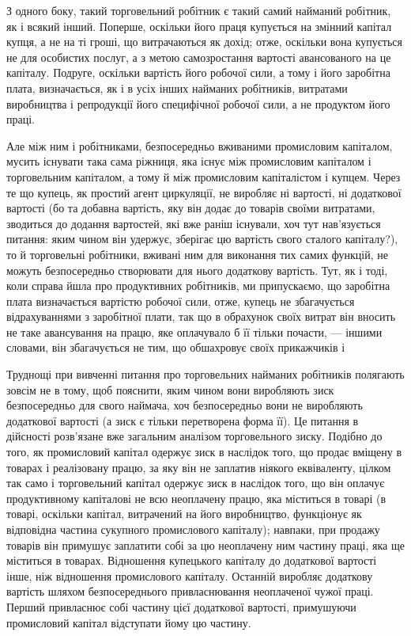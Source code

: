 
З одного боку, такий торговельний робітник є такий самий
найманий робітник, як і всякий інший. Поперше, оскільки його
праця купується на змінний капітал купця, а не на ті гроші, що
витрачаються як дохід; отже, оскільки вона купується не для
особистих послуг, а з метою самозростання вартості авансованого
на це капіталу. Подруге, оскільки вартість його робочої
сили, а тому і його заробітна плата, визначається, як і в усіх
інших найманих робітників, витратами виробництва і репродукції
його специфічної робочої сили, а не продуктом його праці.

Але між ним і робітниками, безпосередньо вживаними промисловим
капіталом, мусить існувати така сама ріжниця, яка існує
між промисловим капіталом і торговельним капіталом, а тому й
між промисловим капіталістом і купцем. Через те що купець, як
простий агент циркуляції, не виробляє ні вартості, ні додаткової
вартості (бо та добавна вартість, яку він додає до товарів своїми
витратами, зводиться до додання вартостей, які вже раніш існували,
хоч тут нав’язується питання: яким чином він удержує, зберігає
цю вартість свого сталого капіталу?), то й торговельні робітники,
вживані ним для виконання тих самих функцій, не можуть
безпосередньо створювати для нього додаткову вартість. Тут, як
і тоді, коли справа йшла про продуктивних робітників, ми припускаємо,
що заробітна плата визначається вартістю робочої сили,
отже, купець не збагачується відрахуваннями з заробітної плати,
так що в обрахунок своїх витрат він вносить не таке авансування
на працю, яке оплачувало б її тільки почасти, — іншими словами,
він збагачується не тим, що обшахровує своїх прикажчиків і~

Труднощі при вивченні питання про торговельних найманих
робітників полягають зовсім не в тому, щоб пояснити, яким чином
вони виробляють зиск безпосередньо для свого наймача, хоч
безпосередньо вони не виробляють додаткової вартості (а зиск
є тільки перетворена форма її). Це питання в дійсності розв’язане
вже загальним аналізом торговельного зиску. Подібно до
того, як промисловий капітал одержує зиск в наслідок того,
що продає вміщену в товарах і реалізовану працю, за яку він
не заплатив ніякого еквіваленту, цілком так само і торговельний
капітал одержує зиск в наслідок того, що він оплачує продуктивному
капіталові не всю неоплачену працю, яка міститься
в товарі (в товарі, оскільки капітал, витрачений на його виробництво,
функціонує як відповідна частина сукупного промислового
капіталу); навпаки, при продажу товарів він примушує
заплатити собі за цю неоплачену ним частину праці, яка ще
міститься в товарах. Відношення купецького капіталу до додаткової
вартості інше, ніж відношення промислового капіталу.
Останній виробляє додаткову вартість шляхом безпосереднього
привласнювання неоплаченої чужої праці. Перший привласнює
собі частину цієї додаткової вартості, примушуючи промисловий
капітал відступати йому цю частину.

